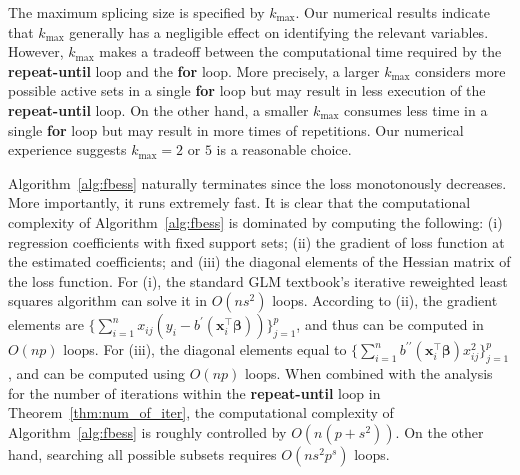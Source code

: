 \begin{remark}
The maximum splicing size is specified by $k_{\max}$.
Our numerical results indicate that $k_{\max}$ generally has a negligible effect on identifying the relevant variables.
However, $k_{\max}$ makes a tradeoff between the computational time required by the \textup{\textbf{repeat-until}} loop and the \textup{\textbf{for}} loop.
More precisely, a larger $k_{\max}$ considers more possible active sets in a single \textup{\textbf{for}} loop
but may result in less execution of the \textup{\textbf{repeat-until}} loop.
On the other hand, a smaller $k_{\max}$ consumes less time in a single \textup{\textbf{for}} loop but may result in more times of repetitions.
Our numerical experience suggests $k_{\max} = 2$ or $5$ is a reasonable choice.
\end{remark}
\begin{remark}
Algorithm~\ref{alg:fbess} naturally terminates since the loss monotonously decreases.
More importantly, it runs extremely fast.
It is clear that the computational complexity of Algorithm~\ref{alg:fbess} is dominated by computing the following:
(i) regression coefficients with fixed support sets;
(ii) the gradient of loss function at the estimated coefficients; and
(iii) the diagonal elements of the Hessian matrix of the loss function.
For (i), the standard GLM textbook's iterative reweighted least squares algorithm can solve it in $O(n s^2)$ loops.
According to (ii), the gradient elements are $\{ \sum\limits_{i=1}^n x_{ij} (y_i - b^\prime(\boldsymbol{x}_i^\top \boldsymbol{\beta})) \}_{j=1}^p$,
and thus can be computed in $O(np)$ loops.
For (iii), the diagonal elements equal to $\{ \sum\limits_{i=1}^n b^{\prime\prime}(\boldsymbol{x}_i^\top \boldsymbol{\beta}) x_{ij}^2 \}_{j=1}^{p}$,
and can be computed using $O(np)$ loops.
When combined with the analysis for the number of iterations within the \textbf{\textup{repeat-until}} loop in Theorem~\ref{thm:num_of_iter},
the computational complexity of Algorithm~\ref{alg:fbess} is roughly controlled by $O(n (p + s^2))$.
On the other hand, searching all possible subsets requires $O(n s^2 p^s)$ loops.
\end{remark}
